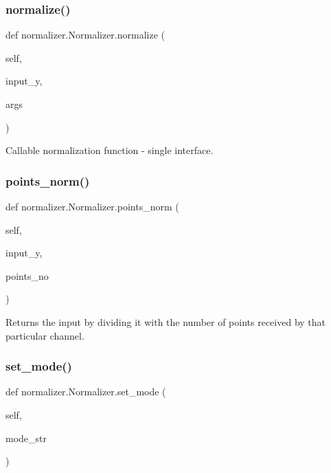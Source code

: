 \subsubsection{\texorpdfstring{normalize()}{normalize()}}
{\footnotesize\ttfamily def normalizer.\+Normalizer.\+normalize (\begin{DoxyParamCaption}\item[{}]{self,  }\item[{}]{input\+\_\+y,  }\item[{}]{args }\end{DoxyParamCaption})}

\begin{DoxyVerb}Callable normalization function - single interface.
\end{DoxyVerb}
 \mbox{\label{classnormalizer_1_1Normalizer_a44aea90aa5ab90fbc6cc617acdc589c5}} 
\subsubsection{\texorpdfstring{points\+\_\+norm()}{points\_norm()}}
{\footnotesize\ttfamily def normalizer.\+Normalizer.\+points\+\_\+norm (\begin{DoxyParamCaption}\item[{}]{self,  }\item[{}]{input\+\_\+y,  }\item[{}]{points\+\_\+no }\end{DoxyParamCaption})}

\begin{DoxyVerb}Returns the input by dividing it with the number of points received by that particular channel.
\end{DoxyVerb}
 \mbox{\label{classnormalizer_1_1Normalizer_ab4e48dd4987836c7254f148672dc32f0}} 
\subsubsection{\texorpdfstring{set\+\_\+mode()}{set\_mode()}}
{\footnotesize\ttfamily def normalizer.\+Normalizer.\+set\+\_\+mode (\begin{DoxyParamCaption}\item[{}]{self,  }\item[{}]{mode\+\_\+str }\end{DoxyParamCaption})}

